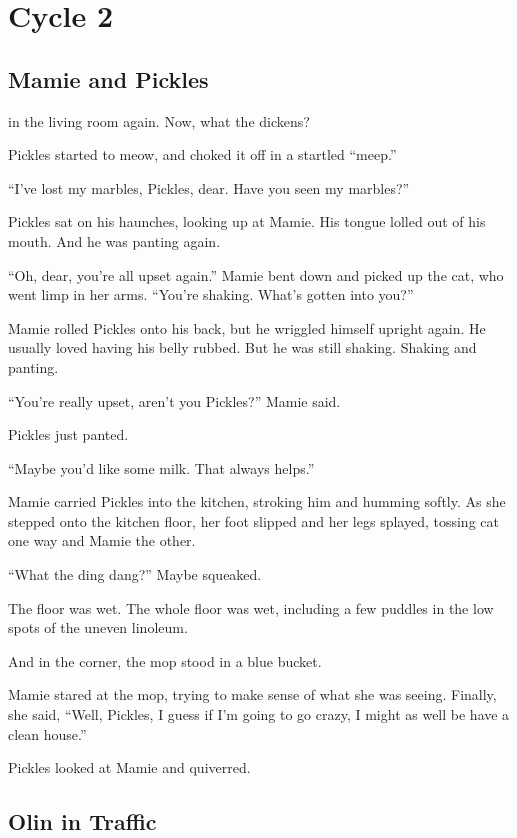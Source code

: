 \chapter{Cycle 2}

\section{Mamie and Pickles}

 in the living room again. Now, what the dickens?

Pickles started to meow, and choked it off in a startled “meep.”

“I’ve lost my marbles, Pickles, dear. Have you seen my marbles?”

Pickles sat on his haunches, looking up at Mamie. His tongue lolled out of his mouth. And he was panting again.

“Oh, dear, you’re all upset again.” Mamie bent down and picked up the cat, who went limp in her arms. “You’re shaking. What’s gotten into you?”

Mamie rolled Pickles onto his back, but he wriggled himself upright again. He usually loved having his belly rubbed. But he was still shaking. Shaking and panting.

“You’re really upset, aren’t you Pickles?” Mamie said.

Pickles just panted.

“Maybe you’d like some milk. That always helps.”

Mamie carried Pickles into the kitchen, stroking him and humming softly. As she stepped onto the kitchen floor, her foot slipped and her legs splayed, tossing cat one way and Mamie the other.

“What the ding dang?” Maybe squeaked.

The floor was wet. The whole floor was wet, including a few puddles in the low spots of the uneven linoleum.

And in the corner, the mop stood in a blue bucket.

Mamie stared at the mop, trying to make sense of what she was seeing. Finally, she said, “Well, Pickles, I guess if I’m going to go crazy, I might as well be have a clean house.”

Pickles looked at Mamie and quiverred.



\section{Olin in Traffic}

